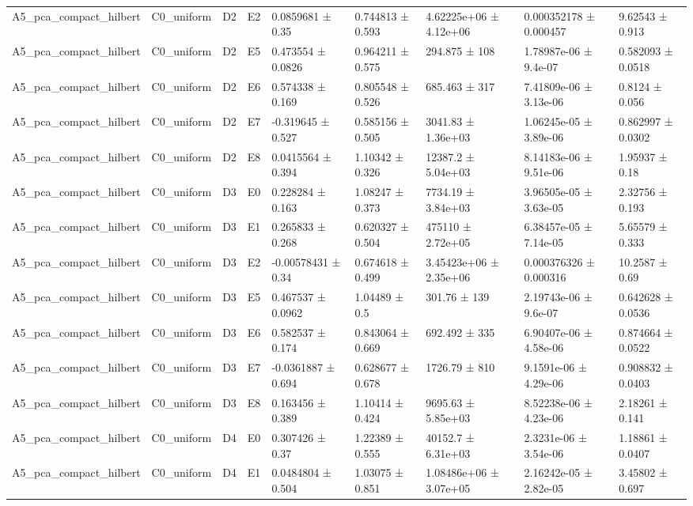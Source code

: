 \begin{table}
\begin{tabular}{lllllllll}
A5\_pca\_compact\_hilbert & C0\_uniform & D2 & E2 & 0.0859681 ± 0.35 & 0.744813 ± 0.593 & 4.62225e+06 ± 4.12e+06 & 0.000352178 ± 0.000457 & 9.62543 ± 0.913 \\
A5\_pca\_compact\_hilbert & C0\_uniform & D2 & E5 & 0.473554 ± 0.0826 & 0.964211 ± 0.575 & 294.875 ± 108 & 1.78987e-06 ± 9.4e-07 & 0.582093 ± 0.0518 \\
A5\_pca\_compact\_hilbert & C0\_uniform & D2 & E6 & 0.574338 ± 0.169 & 0.805548 ± 0.526 & 685.463 ± 317 & 7.41809e-06 ± 3.13e-06 & 0.8124 ± 0.056 \\
A5\_pca\_compact\_hilbert & C0\_uniform & D2 & E7 & -0.319645 ± 0.527 & 0.585156 ± 0.505 & 3041.83 ± 1.36e+03 & 1.06245e-05 ± 3.89e-06 & 0.862997 ± 0.0302 \\
A5\_pca\_compact\_hilbert & C0\_uniform & D2 & E8 & 0.0415564 ± 0.394 & 1.10342 ± 0.326 & 12387.2 ± 5.04e+03 & 8.14183e-06 ± 9.51e-06 & 1.95937 ± 0.18 \\
A5\_pca\_compact\_hilbert & C0\_uniform & D3 & E0 & 0.228284 ± 0.163 & 1.08247 ± 0.373 & 7734.19 ± 3.84e+03 & 3.96505e-05 ± 3.63e-05 & 2.32756 ± 0.193 \\
A5\_pca\_compact\_hilbert & C0\_uniform & D3 & E1 & 0.265833 ± 0.268 & 0.620327 ± 0.504 & 475110 ± 2.72e+05 & 6.38457e-05 ± 7.14e-05 & 5.65579 ± 0.333 \\
A5\_pca\_compact\_hilbert & C0\_uniform & D3 & E2 & -0.00578431 ± 0.34 & 0.674618 ± 0.499 & 3.45423e+06 ± 2.35e+06 & 0.000376326 ± 0.000316 & 10.2587 ± 0.69 \\
A5\_pca\_compact\_hilbert & C0\_uniform & D3 & E5 & 0.467537 ± 0.0962 & 1.04489 ± 0.5 & 301.76 ± 139 & 2.19743e-06 ± 9.6e-07 & 0.642628 ± 0.0536 \\
A5\_pca\_compact\_hilbert & C0\_uniform & D3 & E6 & 0.582537 ± 0.174 & 0.843064 ± 0.669 & 692.492 ± 335 & 6.90407e-06 ± 4.58e-06 & 0.874664 ± 0.0522 \\
A5\_pca\_compact\_hilbert & C0\_uniform & D3 & E7 & -0.0361887 ± 0.694 & 0.628677 ± 0.678 & 1726.79 ± 810 & 9.1591e-06 ± 4.29e-06 & 0.908832 ± 0.0403 \\
A5\_pca\_compact\_hilbert & C0\_uniform & D3 & E8 & 0.163456 ± 0.389 & 1.10414 ± 0.424 & 9695.63 ± 5.85e+03 & 8.52238e-06 ± 4.23e-06 & 2.18261 ± 0.141 \\
A5\_pca\_compact\_hilbert & C0\_uniform & D4 & E0 & 0.307426 ± 0.37 & 1.22389 ± 0.555 & 40152.7 ± 6.31e+03 & 2.3231e-06 ± 3.54e-06 & 1.18861 ± 0.0407 \\
A5\_pca\_compact\_hilbert & C0\_uniform & D4 & E1 & 0.0484804 ± 0.504 & 1.03075 ± 0.851 & 1.08486e+06 ± 3.07e+05 & 2.16242e-05 ± 2.82e-05 & 3.45802 ± 0.697 \\

\end{tabular}
\end{table}
